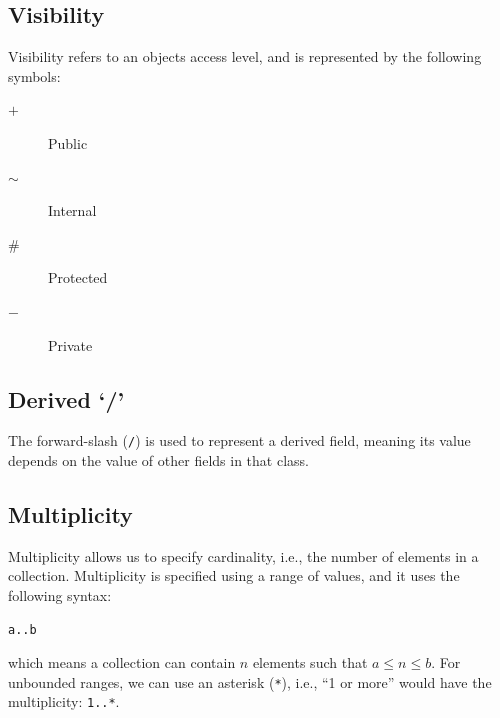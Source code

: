 \documentclass{article}
\begin{document}
\subsection{Visibility}
Visibility refers to an objects access level, and is represented by the
following symbols:
\begin{description}
    \item[\(+\)] Public
    \item[\(\sim\)] Internal
    \item[\(\#\)] Protected
    \item[\(-\)] Private
\end{description}
\subsection{Derived `/'}
The forward-slash (\texttt{/}) is used to represent a
derived field, meaning its value depends on the value of other fields
in that class.
\subsection{Multiplicity}
Multiplicity allows us to specify cardinality, i.e., the number of
elements in a collection. Multiplicity is specified using a range of
values, and it uses the following syntax:
\begin{verbatim}
a..b
\end{verbatim}
which means a collection can contain \(n\) elements such that \(a \leq
n \leq b\). For unbounded ranges, we can use an asterisk
(\texttt{*}), i.e., ``1 or more'' would have the
multiplicity: \texttt{1..*}.
\end{document}
